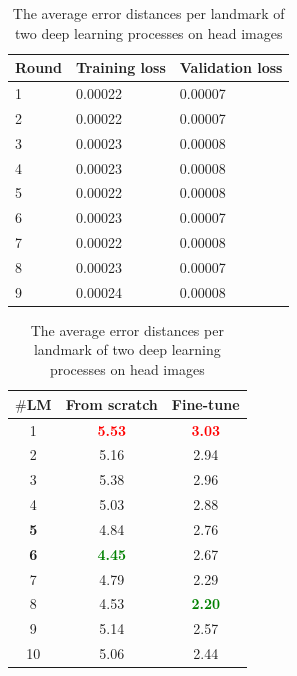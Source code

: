 \documentclass[review]{elsarticle}
\begin{document}
\begin{table}[htbp]
\begin{minipage}[t]{0.45\textwidth}
	\centering
	\begin{tabular}{l p{1.5cm} p{1.5cm}}
	Round & Training loss & Validation loss \\ \hline
	1 & 0.00022 & 0.00007  \\ \hline
	2 & 0.00022 & 0.00007 \\ \hline
	3 & 0.00023 & 0.00008 \\ \hline
	4 & 0.00023 & 0.00008 \\ \hline
	5 & 0.00022 & 0.00008 \\ \hline
	6 & 0.00023 & 0.00007 \\ \hline
	7 & 0.00022 & 0.00008 \\ \hline
	8 & 0.00023 & 0.00007 \\ \hline
	9 & 0.00024 & 0.00008 \\ \hline
	\end{tabular}
	\caption{The losses during fine-tuning model on head dataset}
	\label{tblfthead}
\end{minipage}
\hfill
\begin{minipage}[t]{0.45\textwidth}
\centering
\begin{tabular}{|c|c|c|}
\hline
\textbf{$\#$LM} & \textbf{From scratch} & \textbf{Fine-tune} \\ \hline
1 & \textcolor{red}{\textbf{5.53}} & \textcolor{red}{\textbf{3.03}}  \\ \hline
2 & 5.16 & 2.94  \\ \hline
3 & 5.38  & 2.96 \\ \hline
4 & 5.03  & 2.88 \\ \hline
\textbf{5} & 4.84  & 2.76 \\ \hline
\textbf{6} & \textcolor{green}{\textbf{4.45}}  & 2.67 \\ \hline
7 & 4.79  & 2.29 \\ \hline
8 & 4.53  & \textcolor{green}{\textbf{2.20}} \\ \hline
9 & 5.14  & 2.57 \\ \hline
10 & 5.06  & 2.44 \\ \hline
\end{tabular}
\caption{The average error distances per landmark of two deep learning processes on head images}
\label{tblcmphead}
\end{minipage}
\end{table}
\end{document}
